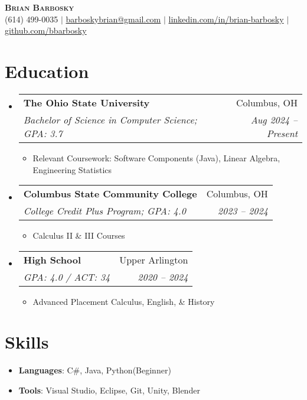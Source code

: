 \documentclass[letterpaper,11pt]{article}
\makeatletter
\newcommand{\resumeItem}[1]{ 
  \item\small{\parbox[t]{0.8\textwidth}{#1} \vspace{-2pt}} 
  }
\newcommand{\resumeSubheading}[4]{ 
  \vspace{-2pt}\item 
  \begin{tabular*}{0.97\textwidth}[t]{l@{\extracolsep{\fill}}r} 
    \textbf{#1} & #2 \\ 
    \textit{\small#3} & \textit{\small #4} \\ 
  \end{tabular*}\vspace{-7pt} 
}
\newcommand{\resumeSubHeadingListStart}{\begin{itemize}[leftmargin=0.15in, label={}]}
\newcommand{\resumeSubHeadingListEnd}{\end{itemize}}
\newcommand{\resumeItemListStart}{\begin{itemize}[leftmargin=0.15in, label={}]}
\newcommand{\resumeItemListEnd}{\end{itemize}\vspace{-5pt}}
\makeatother
\begin{document}
 

\begin{center} 
    \textbf{\Huge \scshape Brian Barbosky} \\ \vspace{1pt} 
    \small (614) 499-0035 $|$ \href{mailto:barboskybrian@gmail.com}{barboskybrian@gmail.com} $|$ 
    \href{https://www.linkedin.com/in/brian-barbosky}{linkedin.com/in/brian-barbosky} $|$ 
    \href{https://github.com/bbarbosky}{github.com/bbarbosky} 
\end{center} 

\section{Education} 
  \resumeSubHeadingListStart 
    \resumeSubheading 
      {The Ohio State University}{Columbus, OH} 
      {Bachelor of Science in Computer Science; GPA: 3.7}{Aug 2024 -- Present} 
      \resumeItemListStart 
        \resumeItem{Relevant Coursework: Software Components (Java), Linear Algebra, Engineering Statistics} 
      \resumeItemListEnd 
    \resumeSubheading 
      {Columbus State Community College}{Columbus, OH} 
      {College Credit Plus Program; GPA: 4.0}{2023 -- 2024} 
      \resumeItemListStart 
        \resumeItem{Calculus II \& III Courses} 
      \resumeItemListEnd 
    \resumeSubheading 
      {High School}{Upper Arlington} 
      {GPA: 4.0 / ACT: 34}{2020 -- 2024} 
      \resumeItemListStart 
        \resumeItem{Advanced Placement Calculus, English, \& History} 
      \resumeItemListEnd 

  \resumeSubHeadingListEnd 

\section{Skills} 
  \resumeItemListStart 
    \resumeItem{\textbf{Languages}: C\#, Java,  Python(Beginner)} 
    \resumeItem{\textbf{Tools}: Visual Studio, Eclipse, Git, Unity, Blender} 
  \resumeItemListEnd 
\end{document}

